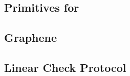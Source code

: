 \subsection{Primitives for \name}
\label{subsec:primitive}

\subsection{Graphene}
\label{subsec:graphenec}


\subsection{Linear Check Protocol}
\vspace{-0.4cm}
